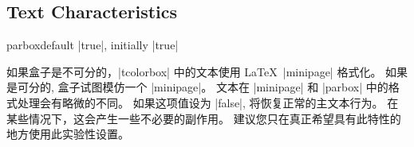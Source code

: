 \subsection{Text Characteristics}
\begin{docTcbKey}[][doc updated=2015-10-14]{parbox}{}{default |true|, initially |true|}

如果盒子是不可分的，|tcolorbox| 中的文本使用 \LaTeX\ |minipage| 格式化。
如果是可分的, 盒子试图模仿一个 |minipage|。%
文本在 |minipage| 和 |parbox| 中的格式处理会有略微的不同。%
如果这项值设为 |false|, 将恢复正常的主文本行为。%
在某些情况下，这会产生一些不必要的副作用。%
建议您只在真正希望具有此特性的地方使用此实验性设置。
\end{docTcbKey}

\begin{dispListing}

\begin{tcolorbox}[parbox,adjusted title={parbox=true (normal)}]
  \lipsum[1-2]
\end{tcolorbox}\hfill%
\begin{tcolorbox}[parbox=false,adjusted title={parbox=false}]
  \lipsum[1-2]
\end{tcolorbox}%
\end{dispListing}
{\tcbusetemp}




